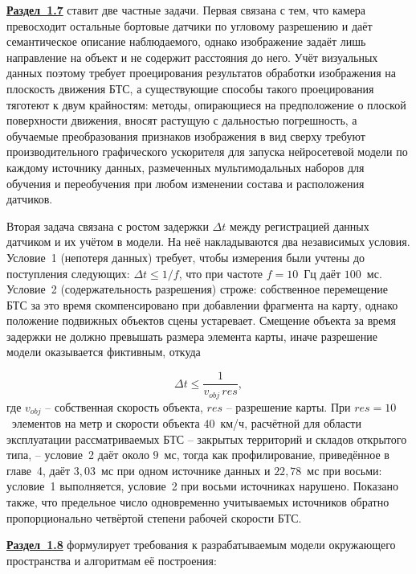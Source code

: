 \underline{\textbf{Раздел~1.7}} ставит две частные задачи. Первая связана с тем, что камера превосходит остальные бортовые датчики по угловому разрешению и даёт семантическое описание наблюдаемого, однако изображение задаёт лишь направление на объект и не содержит расстояния до него. Учёт визуальных данных поэтому требует проецирования результатов обработки изображения на плоскость движения БТС, а существующие способы такого проецирования тяготеют к двум крайностям: методы, опирающиеся на предположение о плоской поверхности движения, вносят растущую с дальностью погрешность, а обучаемые преобразования признаков изображения в вид сверху требуют производительного графического ускорителя для запуска нейросетевой модели по каждому источнику данных, размеченных мультимодальных наборов для обучения и переобучения при любом изменении состава и расположения датчиков.

Вторая задача связана с ростом задержки $\Delta t$ между регистрацией данных датчиком и их учётом в модели. На неё накладываются два независимых условия. Условие~1 (непотеря данных) требует, чтобы измерения были учтены до поступления следующих: $\Delta t \le 1/f$, что при частоте $f = 10$~Гц даёт $100$~мс. Условие~2 (содержательность разрешения) строже: собственное перемещение БТС за это время скомпенсировано при добавлении фрагмента на карту, однако положение подвижных объектов сцены устаревает. Смещение объекта за время задержки не должно превышать размера элемента карты, иначе разрешение модели оказывается фиктивным, откуда

\begin{equation}
	\Delta t \le \frac{1}{v_{obj}\,res},
	\label{eq:syn_dt_limit}
\end{equation}
где $v_{obj}$ -- собственная скорость объекта, $res$ -- разрешение карты. При $res = 10$~элементов на метр и скорости объекта $40$~км/ч, расчётной для области эксплуатации рассматриваемых БТС -- закрытых территорий и складов открытого типа, -- условие~2 даёт около $9$~мс, тогда как профилирование, приведённое в главе~4, даёт $3,03$~мс при одном источнике данных и $22,78$~мс при восьми: условие~1 выполняется, условие~2 при восьми источниках нарушено. Показано также, что предельное число одновременно учитываемых источников обратно пропорционально четвёртой степени рабочей скорости БТС.

\underline{\textbf{Раздел~1.8}} формулирует требования к разрабатываемым модели окружающего пространства и алгоритмам её построения:

